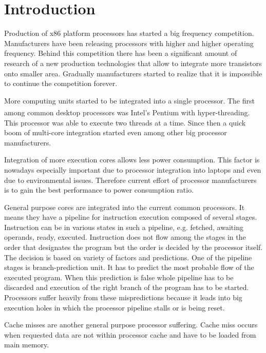 \chapter{Introduction}

\par
Production of x86 platform processors has started a big frequency competition.
Manufacturers have been releasing processors with higher and higher operating frequency.
Behind this competition there has been a significant amount of research of a new production technologies that allow to integrate more transistors onto smaller area.
Gradually manufacturers started to realize that it is impossible to continue the competition forever.

\par
More computing units started to be integrated into a single processor.
The first among common desktop processors was Intel's Pentium\textsuperscript{\textregistered} with hyper-threading.
This processor was able to execute two threads at a time.
Since then a quick boom of multi-core integration started even among other big processor manufacturers.

\par
Integration of more execution cores allows less power consumption.
This factor is nowadays especially important due to processor integration into laptops and even due to environmental issues.
Therefore current effort of processor manufacturers is to gain the best performance to power consumption ratio.

\par
General purpose cores are integrated into the current common processors.
It means they have a pipeline for instruction execution composed of several stages.
Instruction can be in various states in such a pipeline, e.g. fetched, awaiting operands, ready, executed.
Instruction does not flow among the stages in the order that designates the program but the order is decided by the processor itself.
The decision is based on variety of factors and predictions.
One of the pipeline stages is branch-prediction unit.
It has to predict the most probable flow of the executed program.
When this prediction is false whole pipeline has to be discarded and execution of the right branch of the program has to be started.
Processors suffer heavily from these mispredictions because it leads into big execution holes in which the processor pipeline stalls or is being reset.

\par
Cache misses are another general purpose processor suffering.
Cache miss occurs when requested data are not within processor cache and have to be loaded from main memory.

